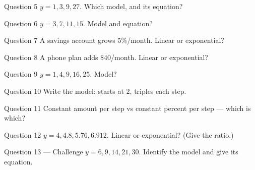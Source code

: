 \documentclass[11pt]{article}
\begin{document}
\begin{qbox}{Question 5}
$y=1,3,9,27$. Which model, and its equation?\workspace{2.4cm}
\end{qbox}

\begin{qbox}{Question 6}
$y=3,7,11,15$. Model and equation?\workspace{2.4cm}
\end{qbox}

\begin{qbox}{Question 7}
A savings account grows $5\%$/month. Linear or exponential?\workspace{2.4cm}
\end{qbox}

\begin{qbox}{Question 8}
A phone plan adds \$40/month. Linear or exponential?\workspace{2.4cm}
\end{qbox}

\begin{qbox}{Question 9}
$y=1,4,9,16,25$. Model?\workspace{2.4cm}
\end{qbox}

\begin{qbox}{Question 10}
Write the model: starts at $2$, triples each step.\workspace{2.4cm}
\end{qbox}

\begin{qbox}{Question 11}
Constant amount per step vs constant percent per step — which is which?\workspace{2.4cm}
\end{qbox}

\begin{qbox}{Question 12}
$y=4,4.8,5.76,6.912$. Linear or exponential? (Give the ratio.)\workspace{2.4cm}
\end{qbox}

\begin{qbox}{Question 13 --- Challenge}
$y=6,9,14,21,30$. Identify the model and give its equation.\workspace{3cm}
\end{qbox}

\clearpage
{}
\end{document}
